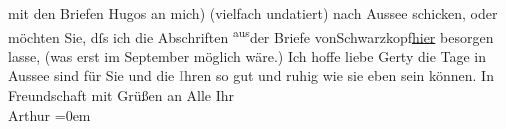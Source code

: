 \begin{ledgroupsized}[t]{13cm}
               mit den Briefen Hugos an mich) {\pb}(vielfach undatiert) nach Aussee schicken, oder möchten Sie, dſs \introOben{}ich\introOben{} die
               Abschriften \substVorne{}\textsuperscript{aus}\substDazwischen{}der Briefe von\substHinten{}{ }Schwarzkopf\uline{hier} besorgen lasse, (was erst im
                  September möglich wäre.)\pend
           \pstart
           Ich hoffe liebe Gerty die Tage in Aussee sind für
               Sie und die \textcolor{gray}{I}hren so gut und ruhig wie sie eben sein können. In
               Freundschaft mit Grüßen an Alle\pend
           \pstart
           Ihr{\\[\baselineskip]}\spacefill\mbox{Arthur}\pend
           \leftskip=0em{}
         
         \endnumbering{}\end{ledgroupsized}  \newcommand{\dateiname}{L02516}\newcommand{\titel}{Arthur Schnitzler an Gerty von Hofmannsthal, 2. 8. 1929}\newcommand{\editorInnen}{Martin Anton Müller und Gerd-Hermann Susen}
      